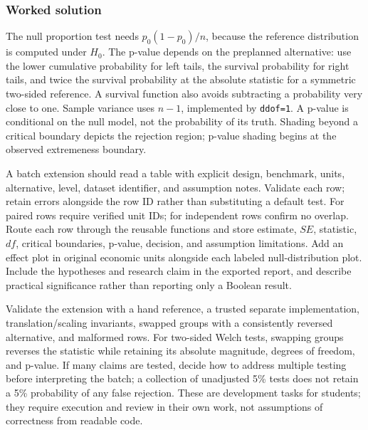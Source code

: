 \subsubsection*{Worked solution}\label{sol:debug}
The null proportion test needs $p_0(1-p_0)/n$, because the reference distribution is computed under $H_0$. The p-value depends on the preplanned alternative: use the lower cumulative probability for left tails, the survival probability for right tails, and twice the survival probability at the absolute statistic for a symmetric two-sided reference. A survival function also avoids subtracting a probability very close to one. Sample variance uses $n-1$, implemented by \texttt{ddof=1}. A p-value is conditional on the null model, not the probability of its truth. Shading beyond a critical boundary depicts the rejection region; p-value shading begins at the observed extremeness boundary.

A batch extension should read a table with explicit design, benchmark, units, alternative, level, dataset identifier, and assumption notes. Validate each row; retain errors alongside the row ID rather than substituting a default test. For paired rows require verified unit IDs; for independent rows confirm no overlap. Route each row through the reusable functions and store estimate, $SE$, statistic, $df$, critical boundaries, p-value, decision, and assumption limitations. Add an effect plot in original economic units alongside each labeled null-distribution plot. Include the hypotheses and research claim in the exported report, and describe practical significance rather than reporting only a Boolean result.

Validate the extension with a hand reference, a trusted separate implementation, translation/scaling invariants, swapped groups with a consistently reversed alternative, and malformed rows. For two-sided Welch tests, swapping groups reverses the statistic while retaining its absolute magnitude, degrees of freedom, and p-value. If many claims are tested, decide how to address multiple testing before interpreting the batch; a collection of unadjusted 5\% tests does not retain a 5\% probability of any false rejection. These are development tasks for students; they require execution and review in their own work, not assumptions of correctness from readable code.


